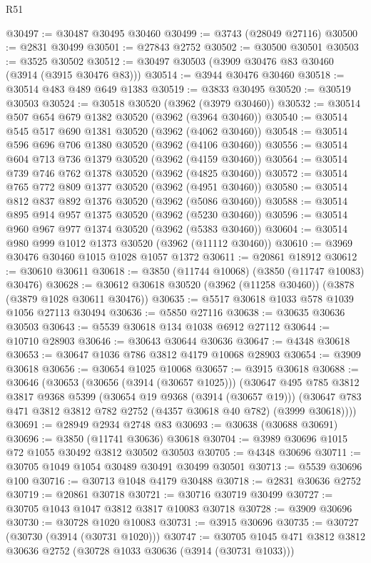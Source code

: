 \begin{lexlean}{R51}
\begin{coremodule}
@30497 := @30487 @30495 @30460
@30499 := @3743 (@28049 @27116)
@30500 := @2831 @30499
@30501 := @27843 @2752
@30502 := @30500 @30501
@30503 := @3525 @30502
@30512 := @30497 @30503 (@3909 @30476 @83 @30460 (@3914 (@3915 @30476 @83)))
@30514 := @3944 @30476 @30460
@30518 := @30514 @483 @489 @649 @1383
@30519 := @3833 @30495
@30520 := @30519 @30503
@30524 := @30518 @30520 (@3962 (@3979 @30460))
@30532 := @30514 @507 @654 @679 @1382 @30520 (@3962 (@3964 @30460))
@30540 := @30514 @545 @517 @690 @1381 @30520 (@3962 (@4062 @30460))
@30548 := @30514 @596 @696 @706 @1380 @30520 (@3962 (@4106 @30460))
@30556 := @30514 @604 @713 @736 @1379 @30520 (@3962 (@4159 @30460))
@30564 := @30514 @739 @746 @762 @1378 @30520 (@3962 (@4825 @30460))
@30572 := @30514 @765 @772 @809 @1377 @30520 (@3962 (@4951 @30460))
@30580 := @30514 @812 @837 @892 @1376 @30520 (@3962 (@5086 @30460))
@30588 := @30514 @895 @914 @957 @1375 @30520 (@3962 (@5230 @30460))
@30596 := @30514 @960 @967 @977 @1374 @30520 (@3962 (@5383 @30460))
@30604 := @30514 @980 @999 @1012 @1373 @30520 (@3962 (@11112 @30460))
@30610 := @3969 @30476 @30460 @1015 @1028 @1057 @1372
@30611 := @20861 @18912
@30612 := @30610 @30611
@30618 := @3850 (@11744 @10068) (@3850 (@11747 @10083) @30476)
@30628 := @30612 @30618 @30520 (@3962 (@11258 @30460)) (@3878 (@3879 @1028 @30611 @30476))
@30635 := @5517 @30618 @1033 @578 @1039 @1056 @27113 @30494
@30636 := @5850 @27116
@30638 := @30635 @30636 @30503
@30643 := @5539 @30618 @134 @1038 @6912 @27112
@30644 := @10710 @28903
@30646 := @30643 @30644 @30636
@30647 := @4348 @30618
@30653 := @30647 @1036 @786 @3812 @4179 @10068 @28903
@30654 := @3909 @30618
@30656 := @30654 @1025 @10068
@30657 := @3915 @30618
@30688 := @30646
    (@30653
      (@30656 (@3914 (@30657 @1025)))
      (@30647
        @495
        @785
        @3812
        @3817
        @9368
        @5399
        (@30654 @19 @9368 (@3914 (@30657 @19)))
        (@30647 @783 @471 @3812 @3812 @782 @2752 (@4357 @30618 @40 @782) (@3999 @30618))))
@30691 := @28949 @2934 @2748 @83
@30693 := @30638 (@30688 @30691)
@30696 := @3850 (@11741 @30636) @30618
@30704 := @3989 @30696 @1015 @72 @1055 @30492 @3812 @30502 @30503
@30705 := @4348 @30696
@30711 := @30705 @1049 @1054 @30489 @30491 @30499 @30501
@30713 := @5539 @30696 @100
@30716 := @30713 @1048 @4179 @30488
@30718 := @2831 @30636 @2752
@30719 := @20861 @30718
@30721 := @30716 @30719 @30499
@30727 := @30705 @1043 @1047 @3812 @3817 @10083 @30718
@30728 := @3909 @30696
@30730 := @30728 @1020 @10083
@30731 := @3915 @30696
@30735 := @30727 (@30730 (@3914 (@30731 @1020)))
@30747 := @30705 @1045 @471 @3812 @3812 @30636 @2752 (@30728 @1033 @30636 (@3914 (@30731 @1033)))

\end{coremodule}
\end{lexlean}
